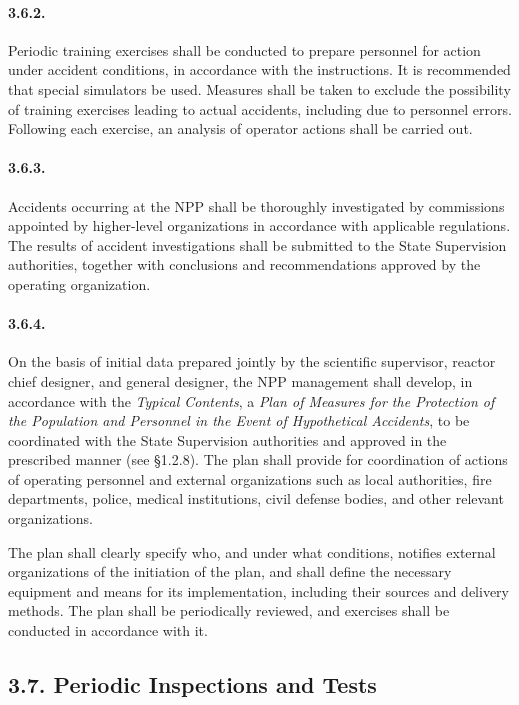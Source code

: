 \documentclass[openright]{bookest}
\begin{document}
\paragraph{3.6.2.}
Periodic training exercises shall be conducted to prepare personnel for action under accident conditions, in accordance with the instructions.  
It is recommended that special simulators be used.  
Measures shall be taken to exclude the possibility of training exercises leading to actual accidents, including due to personnel errors.  
Following each exercise, an analysis of operator actions shall be carried out.

\paragraph{3.6.3.}
Accidents occurring at the NPP shall be thoroughly investigated by commissions appointed by higher-level organizations in accordance with applicable regulations.  
The results of accident investigations shall be submitted to the State Supervision authorities, together with conclusions and recommendations approved by the operating organization.

\paragraph{3.6.4.}
On the basis of initial data prepared jointly by the scientific supervisor, reactor chief designer, and general designer, the NPP management shall develop, in accordance with the \textit{Typical Contents}, a \textit{Plan of Measures for the Protection of the Population and Personnel in the Event of Hypothetical Accidents}, to be coordinated with the State Supervision authorities and approved in the prescribed manner (see §1.2.8).  
The plan shall provide for coordination of actions of operating personnel and external organizations such as local authorities, fire departments, police, medical institutions, civil defense bodies, and other relevant organizations.

The plan shall clearly specify who, and under what conditions, notifies external organizations of the initiation of the plan, and shall define the necessary equipment and means for its implementation, including their sources and delivery methods.  
The plan shall be periodically reviewed, and exercises shall be conducted in accordance with it.

\subsection*{3.7. Periodic Inspections and Tests}
\end{document}
